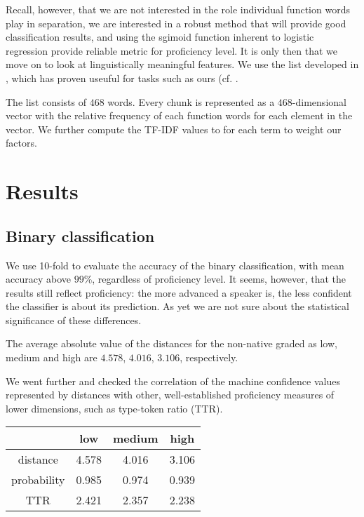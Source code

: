 \documentclass[11pt]{article}
\begin{document}
Recall, however, that we are not interested in the role individual function words play in separation, we are interested in a robust method that will provide good  classification results, and using the sgimoid function inherent to logistic regression provide reliable metric for proficiency level. It is only then that we  move on to look  at linguistically meaningful features. We use the list developed in \citet{pennebaker2001linguistic}, which has proven useuful for tasks such as ours (cf. \citet{koppel2011translationese}.

The list consists of $468$ words. Every chunk is  represented as a $468$-dimensional vector with the relative frequency of each function words for each element in the vector. We further compute the TF-IDF values to for each term to weight our factors.    

\section{ Results}
\subsection{Binary classification}
We use 10-fold to evaluate the accuracy of the binary classification, with mean accuracy above $99$\%, regardless of proficiency level. It seems, however, that the results still reflect proficiency: the more advanced a speaker is, the less confident the classifier is about its prediction. As yet we are not sure about the statistical significance of these differences.

The average absolute value of the distances for the non-native graded as low, medium and high are $4.578$,   
$4.016$, $3.106$, respectively. 

We went further and checked the correlation of the machine confidence values represented by distances with other, well-established proficiency measures of lower dimensions, such as type-token ratio (TTR).

\begin{tabular}{|c|c|c|c|}
	\hline 
	&low  &medium  &high  \\ 
	\hline 
	distance&4.578  &4.016  &3.106  \\ 
	\hline 
	probability&0.985 &0.974  &0.939  \\ 
	\hline 
	TTR&2.421  &2.357  &2.238 \\	
	\hline 
\end{tabular} 
\end{document}
